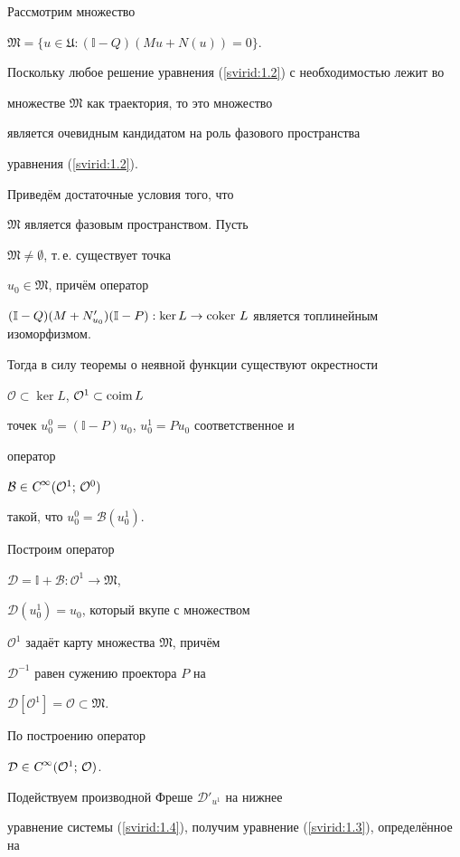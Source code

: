 Рассмотрим множество

$\mathfrak{M}=\{u\in\mathfrak{U}:(\mathbb{I}-Q)(Mu+N(u))=0\}$.

Поскольку любое решение уравнения (\ref{svirid:1.2}) с необходимостью лежит во

множестве $\mathfrak{M}$ как траектория, то это множество

является очевидным кан\-ди\-да\-том на роль фазового пространства

уравнения (\ref{svirid:1.2}).

Приведём дос\-та\-точ\-ные условия того, что

$\mathfrak{M}$ яв\-ля\-ет\-ся фазовым про\-стран\-ством. Пусть

$\mathfrak{M}\neq \emptyset$, т.\,е. существует точка

$u_0\in\mathfrak{M}$, причём оператор

$(\mathbb{I}-Q)(M+N'_{u_0})(\mathbb{I}-P):\ker

L\rightarrow{\rm coker \ } L$ является топлинейным изоморфизмом.

Тогда в силу теоремы о неявной функции существуют ок\-рест\-нос\-ти

$\mathcal{O}\subset\ker L$, $\mathcal{O}^1\subset{\rm coim \, } L$

точек $u_0^0=(\mathbb{I}-P)u_0$, $u_0^1=Pu_0$ соответственное и

оператор

$\mathcal{B}\in\textsl{C}^\infty(\mathcal{O}^1;\,\mathcal{O}^0)$

такой, что $u_0^0=\mathcal{B}(u_0^1)$.

Построим оператор

$\mathcal{D}=\mathbb{I}+\mathcal{B}:\mathcal{O}^1\rightarrow\mathfrak{M}$,

$\mathcal{D}(u_0^1)=u_0$, который вкупе с множеством

$\mathcal{O}^1$ задаёт карту множества $\mathfrak{M}$, причём

$\mathcal{D}^{-1}$ равен сужению проектора $P$ на

$\mathcal{D}[\mathcal{O}^1]=\mathcal{O}\subset\mathfrak{M}$.

По построению оператор

$\mathcal{D}\in\textsl{C}^\infty(\mathcal{O}^1;\,\mathcal{O})$.

Подействуем производной Фреше $\mathcal{D}'_{u^1}$ на нижнее

уравнение системы (\ref{svirid:1.4}), получим уравнение (\ref{svirid:1.3}), определённое на

